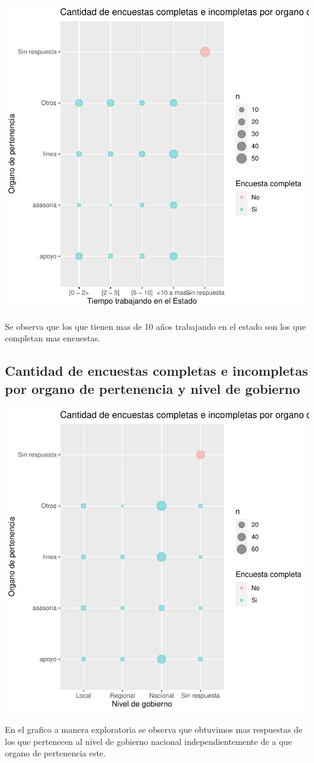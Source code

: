 \documentclass{article}
\begin{document}
\includegraphics{seguimientov3-092}

Se observa que los que tienen mas de 10 años trabajando en el estado son los que completan mas encuestas.

\subsection{Cantidad de encuestas completas e incompletas por organo de pertenencia y nivel de gobierno}

\includegraphics{seguimientov3-093}

En el grafico a manera exploratoria se observa que obtuvimos mas respuestas de los que pertenecen al nivel de gobierno nacional independientemente de a que organo de pertenencia este.
\end{document}
